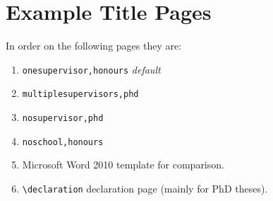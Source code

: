 \documentclass[12pt,oneside]{article}
\newcommand{\oporcom}[1]{\texttt{\color{RoyalBlue}#1}} %
\begin{document}
\section{Example Title Pages}
In order on the following pages they are:
\begin{enumerate}
    \item \oporcom{onesupervisor,honours} \emph{default}
    \item \oporcom{multiplesupervisors,phd}
    \item \oporcom{nosupervisor,phd}
    \item \oporcom{noschool,honours}
    \item Microsoft Word 2010 template for comparison.
    \item \oporcom{\textbackslash{}declaration} declaration page (mainly for PhD theses).
\end{enumerate}






\end{document}
